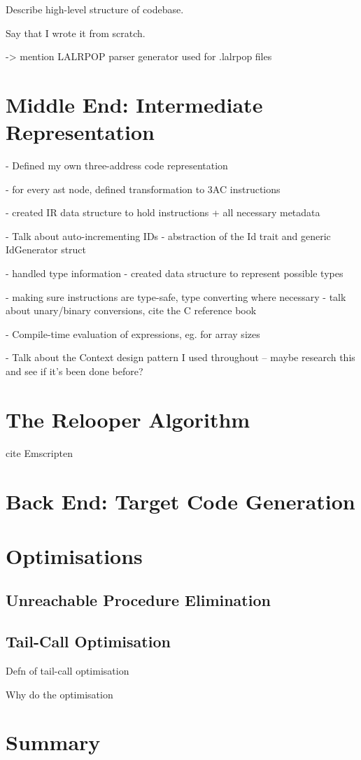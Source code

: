 \documentclass[00-main.tex]{subfiles}
\begin{document}
\begin{Comment}
Describe high-level structure of codebase.

Say that I wrote it from scratch.

-> mention LALRPOP parser generator used for .lalrpop files
\end{Comment}

\section{Middle End: Intermediate Representation}

\begin{Comment}
- Defined my own three-address code representation

- for every ast node, defined transformation to 3AC instructions

- created IR data structure to hold instructions + all necessary metadata

- Talk about auto-incrementing IDs - abstraction of the Id trait and generic IdGenerator struct

- handled type information - created data structure to represent possible types

- making sure instructions are type-safe, type converting where necessary - talk about unary/binary conversions, cite the C reference book

- Compile-time evaluation of expressions, eg. for array sizes

- Talk about the Context design pattern I used throughout -- maybe research this and see if it's been done before?
\end{Comment}

\section{The Relooper Algorithm}

\begin{Comment}
cite Emscripten \cite{emscripten}
\end{Comment}

\section{Back End: Target Code Generation}


\section{Optimisations}

\subsection{Unreachable Procedure Elimination}

\subsection{Tail-Call Optimisation}

\begin{Comment}
Defn of tail-call optimisation

Why do the optimisation
\end{Comment}

\section{Summary}
\end{document}
